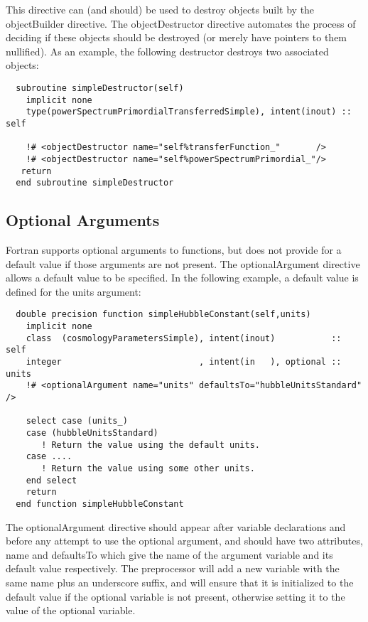 This directive can (and should) be used to destroy objects built by the {\normalfont \ttfamily objectBuilder} directive. The {\normalfont \ttfamily objectDestructor} directive automates the process of deciding if these objects should be destroyed (or merely have pointers to them nullified). As an example, the following destructor destroys two associated objects:
\begin{lstlisting}  
  subroutine simpleDestructor(self)
    implicit none
    type(powerSpectrumPrimordialTransferredSimple), intent(inout) :: self

    !# <objectDestructor name="self%transferFunction_"       />
    !# <objectDestructor name="self%powerSpectrumPrimordial_"/>
   return
  end subroutine simpleDestructor
\end{lstlisting}

\subsection{Optional Arguments}

Fortran supports optional arguments to functions, but does not provide for a default value if those arguments are not present. The {\normalfont \ttfamily optionalArgument} directive allows a default value to be specified. In the following example, a default value is defined for the {\normalfont \ttfamily units} argument:

\begin{lstlisting}
  double precision function simpleHubbleConstant(self,units)
    implicit none
    class  (cosmologyParametersSimple), intent(inout)           :: self
    integer                           , intent(in   ), optional :: units
    !# <optionalArgument name="units" defaultsTo="hubbleUnitsStandard" />

    select case (units_)
    case (hubbleUnitsStandard)
       ! Return the value using the default units.
    case ....
       ! Return the value using some other units.
    end select
    return
  end function simpleHubbleConstant
\end{lstlisting}
The {\normalfont \ttfamily optionalArgument} directive should appear after variable declarations and before any attempt to use the optional argument, and should have two attributes, {\normalfont \ttfamily name} and {\normalfont \ttfamily defaultsTo} which give the name of the argument variable and its default value respectively. The preprocessor will add a new variable with the same name plus an underscore suffix, and will ensure that it is initialized to the default value if the optional variable is not present, otherwise setting it to the value of the optional variable.

